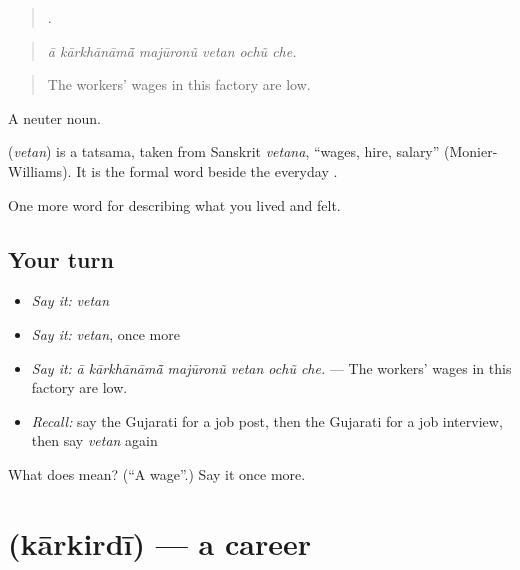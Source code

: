 \begin{quote}
     .
\end{quote}

\begin{quote}
\emph{ā kārkhānāmā̃ majūronũ vetan ochũ che.}
\end{quote}

\begin{quote}
The workers' wages in this factory are low.
\end{quote}

A neuter noun.

\begin{cousinweb}
\textbf{} (\emph{vetan}) is a tatsama, taken from Sanskrit \emph{vetana}, \textquotedblleft{}wages, hire, salary\textquotedblright{} (Monier-Williams). It is the formal word beside the everyday \textbf{}.
\end{cousinweb}

\begin{grammarlens}[title={What you've built}]
One more word for describing what you lived and felt.
\end{grammarlens}

\subsection*{Your turn}
\begin{itemize}
\raggedright
  \item \emph{Say it:} \emph{vetan}
  \item \emph{Say it:} \emph{vetan}, once more
  \item \emph{Say it:} \emph{ā kārkhānāmā̃ majūronũ vetan ochũ che.} — The workers' wages in this factory are low.
  \item \emph{Recall:} say the Gujarati for a job post, then the Gujarati for a job interview, then say \emph{vetan} again
\end{itemize}

\begin{tcolorbox}[breakable,colback=teal!4,colframe=teal!35!black,title={Before you move on}]
What does  mean? (\textquotedblleft{}A wage\textquotedblright{}.) Say it once more.
\end{tcolorbox}
\section[\texorpdfstring{\gu{કારકિર્દી} (kārkirdī)}{કારકિર્દી (kārkirdī)}]{ (kārkirdī) — a career}

